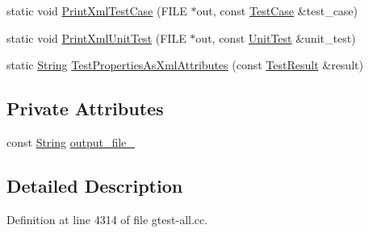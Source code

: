 \begin{DoxyCompactItemize}
\item 
static void \hyperlink{classtesting_1_1internal_1_1XmlUnitTestResultPrinter_a58ae2058b981af1ac3d683b3355a9d06}{\-Print\-Xml\-Test\-Case} (\-F\-I\-L\-E $\ast$out, const \hyperlink{classtesting_1_1TestCase}{\-Test\-Case} \&test\-\_\-case)
\item 
static void \hyperlink{classtesting_1_1internal_1_1XmlUnitTestResultPrinter_ad0d57b193853f937319445785a4679c7}{\-Print\-Xml\-Unit\-Test} (\-F\-I\-L\-E $\ast$out, const \hyperlink{classtesting_1_1UnitTest}{\-Unit\-Test} \&unit\-\_\-test)
\item 
static \hyperlink{classtesting_1_1internal_1_1String}{\-String} \hyperlink{classtesting_1_1internal_1_1XmlUnitTestResultPrinter_a94823a58012c9c474571b9b7bcf060cf}{\-Test\-Properties\-As\-Xml\-Attributes} (const \hyperlink{classtesting_1_1TestResult}{\-Test\-Result} \&result)
\end{DoxyCompactItemize}
\subsection*{\-Private \-Attributes}
\begin{DoxyCompactItemize}
\item 
const \hyperlink{classtesting_1_1internal_1_1String}{\-String} \hyperlink{classtesting_1_1internal_1_1XmlUnitTestResultPrinter_a20d1d061771050add045d968a88ab3ff}{output\-\_\-file\-\_\-}
\end{DoxyCompactItemize}


\subsection{\-Detailed \-Description}


\-Definition at line 4314 of file gtest-\/all.\-cc.



